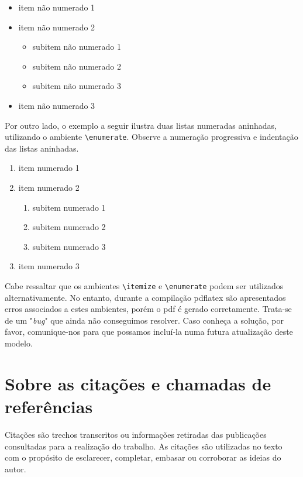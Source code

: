 \begin{apendicesenv}
\begin{itemize}
    \item item não numerado 1
    \item item não numerado 2
    \begin{itemize}
        \item subitem não numerado 1
        \item subitem não numerado 2
        \item subitem não numerado 3
    \end{itemize}
    \item item não numerado 3
\end{itemize}

Por outro lado, o exemplo a seguir ilustra duas listas numeradas aninhadas, utilizando o ambiente \verb|\enumerate|. Observe a numeração progressiva e indentação das listas aninhadas.

\begin{enumerate}
    \item item numerado 1
    \item item numerado 2
    \begin{enumerate}
        \item subitem numerado 1
        \item subitem numerado 2
        \item subitem numerado 3
    \end{enumerate}
    \item item numerado 3
\end{enumerate}

Cabe ressaltar que os ambientes \verb|\itemize| e \verb|\enumerate| podem ser utilizados alternativamente. No entanto, durante a compilação pdflatex são apresentados erros associados a estes ambientes, porém o pdf é gerado corretamente. Trata-se de um "\textit{bug}"{} que ainda não conseguimos resolver. Caso conheça a solução, por favor, comunique-nos para que possamos incluí-la numa futura atualização deste modelo.


\chapter{Sobre as citações e chamadas de referências}
\label{chap:sobre_as_citacoes}

Citações são trechos transcritos ou informações retiradas das publicações consultadas para a realização do trabalho.
As citações são utilizadas no texto com o propósito de esclarecer, completar, embasar ou corroborar as ideias do autor.


\end{apendicesenv}
